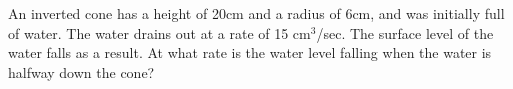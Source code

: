\documentclass[preview]{standalone}
\begin{document}
\begin{center}
An inverted cone has a height of 20cm and a radius of 6cm, and was initially full of water.
The water drains out at a rate of 15 cm$^3$/sec.
The surface level of the water falls as a result. At what rate is the water level falling when the water is halfway down the cone?
\end{center}
\end{document}
